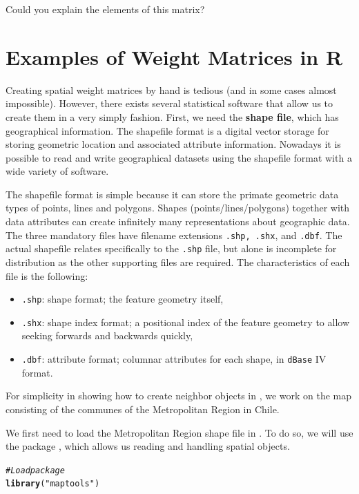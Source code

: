 \documentclass[english,12pt]{book}\usepackage[]{graphicx}\usepackage[]{xcolor}
\makeatletter
\newcommand{\hlstr}[1]{\textcolor[rgb]{0.192,0.494,0.8}{#1}}%
\newcommand{\hlcom}[1]{\textcolor[rgb]{0.678,0.584,0.686}{\textit{#1}}}%
\newcommand{\hlstd}[1]{\textcolor[rgb]{0.345,0.345,0.345}{#1}}%
\newcommand{\hlkwd}[1]{\textcolor[rgb]{0.737,0.353,0.396}{\textbf{#1}}}%
\newenvironment{kframe}{%
 \def\at@end@of@kframe{}%
 \ifinner\ifhmode%
  \def\at@end@of@kframe{\end{minipage}}%
  \begin{minipage}{\columnwidth}%
 \fi\fi%
 \def\FrameCommand##1{\hskip\@totalleftmargin \hskip-\fboxsep
 \colorbox{shadecolor}{##1}\hskip-\fboxsep
     \hskip-\linewidth \hskip-\@totalleftmargin \hskip\columnwidth}%
 \MakeFramed {\advance\hsize-\width
   \@totalleftmargin\z@ \linewidth\hsize
   \@setminipage}}%
 {\par\unskip\endMakeFramed%
 \at@end@of@kframe}
\newenvironment{knitrout}{}{} %
\makeatother
\begin{document}
Could you explain the elements of this matrix?


\section{Examples of Weight Matrices in R}

Creating spatial weight matrices by hand is tedious (and in some cases almost impossible). However, there exists several statistical software that allow us to create them in a very simply fashion.  First, we need the \textbf{shape file}, which has geographical information.  The shapefile format is a digital vector storage for storing geometric location and associated attribute information. Nowadays it is possible to read and write geographical datasets using the shapefile format with a wide variety of software.

The shapefile format is simple because it can store the primate geometric data types of points, lines and polygons. Shapes (points/lines/polygons) together with data attributes can create infinitely many representations about geographic data. The three mandatory files have filename extensions \texttt{.shp, .shx}, and \texttt{.dbf}. The actual shapefile relates specifically to the \texttt{.shp} file, but alone is incomplete for distribution as the other supporting files are required. The characteristics of each file is the following:

\begin{itemize}
  \item \texttt{.shp}: shape format; the feature geometry itself,
  \item \texttt{.shx}: shape index format; a positional index of the feature geometry to allow seeking forwards and backwards quickly,
  \item \texttt{.dbf}: attribute format; columnar attributes for each shape, in \texttt{dBase} IV format. 
\end{itemize}

For simplicity in showing how to create neighbor objects in , we work on the map consisting of the communes of the Metropolitan Region in Chile. 

We first need to load the Metropolitan Region shape file in . To do so, we will use the  package \citep{maptoolsP}, which allows us reading and handling spatial objects. 

\begin{knitrout}
\color{fgcolor}\begin{kframe}
\begin{alltt}
\hlcom{#Load package}
\hlkwd{library}\hlstd{(}\hlstr{"maptools"}\hlstd{)}
\end{alltt}
\end{kframe}
\end{knitrout}
\end{document}
